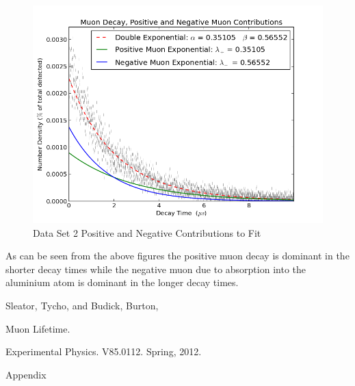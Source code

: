 \begin{figure}[H]
\begin{center}
\includegraphics[width=4 in]{graph_EPBB2_CompExp.png}
\caption{Data Set 2 Positive and Negative Contributions to Fit}
\end{center}
\end{figure}

As can be seen from the above figures the positive muon decay is dominant in the shorter decay times while the negative muon due to absorption into the aluminium atom is dominant in the longer decay times.  



\begin{thebibliography}{99}
Sleator, Tycho, and Budick, Burton, \begin{em}Muon Lifetime. \end{em}Experimental Physics. V85.0112. Spring, 2012.
\end{thebibliography}

\newpage \LARGE{Appendix}

  
